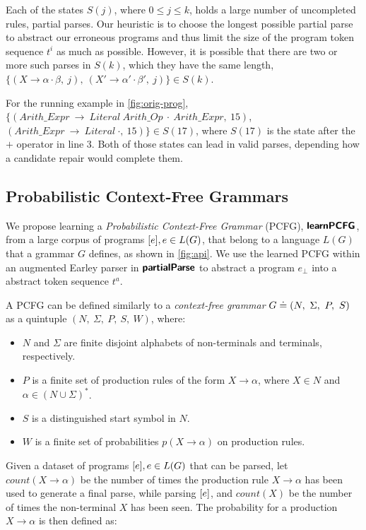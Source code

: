  Each of the states $S(j)$, where $0
\leq j \leq k$, holds a large number of uncompleted rules, \ie partial parses.
Our heuristic is to choose the longest possible partial parse to abstract our
erroneous programs and thus limit the size of the program token sequence $t^i$
as much as possible. However, it is possible that there are two or more such
parses in $S(k)$, which they have the same length, \eg $\{(X \rightarrow \alpha
\cdot \beta,\ j),\ (X' \rightarrow \alpha' \cdot \beta',\ j)\} \in S(k)$.


 For the running example in \autoref{fig:orig-prog},
$\{(Arith\_Expr\ \rightarrow\ Literal\ Arith\_Op\ \cdot\ Arith\_Expr,\ 15)$,
$(Arith\_Expr\ \rightarrow\ Literal\ \cdot,\ 15)\} \in S(17)$, where $S(17)$ is
the state after the $+$ operator in line 3. Both of those states can lead in
valid parses, depending how a candidate repair would complete them.


\subsection{Probabilistic Context-Free Grammars}
\label{sec:prog-abstract:pcfg}
We propose learning a \emph{Probabilistic Context-Free Grammar} (PCFG),
$\bm{\mathsf{learnPCFG}}$, from a large corpus of programs $[e], e \in L(G)$, that
belong to a language $L(G)$ that a grammar $G$ defines, as shown in
\autoref{fig:api}. We use the learned PCFG within an augmented Earley parser in
$\bm{\mathsf{partialParse}}$ to abstract a program $e_{\bot}$ into a abstract token sequence
$t^a$.

A PCFG can be defined similarly to a \emph{context-free grammar} $G \doteq (N,\
\Sigma,\ P,\ S)$ as a quintuple $(N,\ \Sigma,\ P,\ S,\ W)$, where:
\begin{itemize}
    \item $N$ and $\Sigma$ are finite disjoint alphabets of non-terminals and
    terminals, respectively.
    \item $P$ is a finite set of production rules of the form $X \rightarrow
    \alpha$, where $X \in N$ and $\alpha \in (N \cup \Sigma)^{\ast}$.
    \item $S$ is a distinguished start symbol in $N$.
    \item $W$ is a finite set of probabilities $p(X \rightarrow \alpha)$ on
    production rules.
\end{itemize}

Given a dataset of programs $[e], e \in L(G)$ that can be parsed, let
$count(X \rightarrow \alpha)$ be the number of times the production rule $X
\rightarrow \alpha$ has been used to generate a final parse, while parsing
$[e]$, and $count(X)$ be the number of times the non-terminal $X$ has been
seen. The probability for a production $X \rightarrow \alpha$ is then defined
as:

